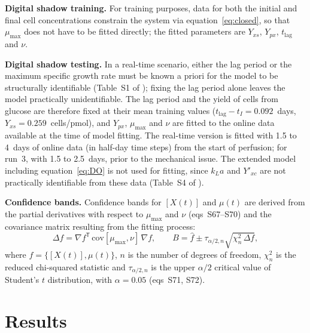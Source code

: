 \documentclass[11pt,a4paper]{article}
\newcommand{\kla}{k_La}
\newcommand{\tlag}{t_{\mathrm{lag}}}
\newcommand{\mumax}{\mu_{\max}}
\newcommand{\cX}{[X(t)]}
\begin{document}
\textbf{Digital shadow training.} For training purposes, data for both the initial and final cell
concentrations constrain the system via equation~\eqref{eq:closed}, so that $\mumax$ does not have to be
fitted directly; the fitted parameters are $Y_{xs}$, $Y_{px}$, $\tlag$ and $\nu$.

\textbf{Digital shadow testing.} In a real-time scenario, either the lag period or the maximum
specific growth rate must be known a priori for the model to be structurally identifiable
(Table~S1 of \cite{egan2025}); fixing the lag period alone leaves the model practically
unidentifiable. The lag period and the yield of cells from glucose are therefore fixed at their mean
training values ($\tlag-t_I=0.092$~days, $Y_{xs}=0.259$~cells/pmol), and $Y_{px}$, $\mumax$ and $\nu$
are fitted to the online data available at the time of model fitting. The real-time version is
fitted with 1.5 to 4~days of online data (in half-day time steps) from the start of perfusion; for
run~3, with 1.5 to 2.5~days, prior to the mechanical issue. The extended model including
equation~\eqref{eq:DO} is not used for fitting, since $\kla$ and $Y'_{xc}$ are not practically
identifiable from these data (Table~S4 of \cite{egan2025}).

\textbf{Confidence bands.} Confidence bands for $\cX$ and $\mu(t)$ are derived from the partial
derivatives with respect to $\mumax$ and $\nu$ (eqs~S67--S70) and the covariance matrix resulting
from the fitting process:
\begin{equation}
  \Delta f = \nabla f^{\mathsf T}\,\mathrm{cov}[\mumax,\nu]\,\nabla f, \qquad
  B = \hat f \pm \tau_{\alpha/2,n}\sqrt{\chi^2_n\,\Delta f}, \label{eq:band}
\end{equation}
where $f=\{\cX,\mu(t)\}$, $n$ is the number of degrees of freedom, $\chi^2_n$ is the reduced
chi-squared statistic and $\tau_{\alpha/2,n}$ is the upper $\alpha/2$ critical value of Student's $t$
distribution, with $\alpha=0.05$ (eqs~S71, S72).

\section{Results}
\end{document}
